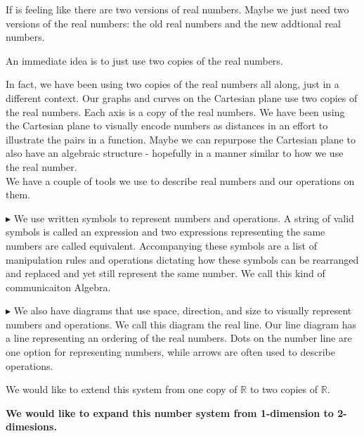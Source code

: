\documentclass{ximera}
\begin{document}
If is feeling like there are two versions of real numbers. Maybe we just need two versions of the real numbers: the old real numbers and the new addtional real numbers.





\begin{center}
An immediate idea is to just use two copies of the real numbers.
\end{center}


In fact, we have been using two copies of the real numbers all along, just in a different context. Our graphs and curves on the Cartesian plane use two copies of the real numbers.  Each axis is a copy of the real numbers. We have been using the Cartesian plane to visually encode numbers as distances in an effort to illustrate the pairs in a function. Maybe we can repurpose the Cartesian plane to also have an algebraic structure - hopefully in a manner similar to how we use the real number. \\








We have a couple of tools we use to describe real numbers and our operations on them.


$\blacktriangleright$  We use written symbols to represent numbers and operations.  A string of valid symbols is called an expression and two expressions representing the same numbers are called equivalent. Accompanying these symbols are a list of manipulation rules and operations dictating how these symbols can be rearranged and replaced and yet still represent the same number.  We call this kind of communicaiton Algebra.


$\blacktriangleright$  We also have diagrams that use space, direction, and size to visually represent numbers and operations. We call this diagram the real line. Our line diagram has a line representing an ordering of the real numbers. Dots on the number line are one option for representing numbers, while arrows are often used to describe operations.


We would like to extend this system from one copy of \textbf{$\mathbb{R}$} to two copies of \textbf{$\mathbb{R}$}. \\



\begin{center}
\textbf{\textcolor{red!90!darkgray}{We would like to expand this number system from 1-dimension to 2-dimesions.}}
\end{center}
\end{document}
